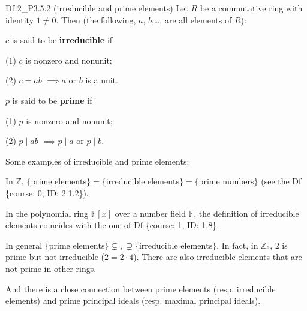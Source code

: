 \documentclass{article}
\begin{document}
\begin{Df}{Df 2\_P3.5.2 (irreducible and prime elements)}
    Let $R$ be a commutative ring with identity $1\neq 0$. Then (the following, $a$, $b$,\dots, are all elements of $R$):
    \begin{compactitem}
        \item $c$ is said to be \textbf{irreducible} if
        \begin{compactenum}
            \item[(1)] $c$ is nonzero and nonunit;
            \item[(2)] $c=ab$ \quad $\implies$\quad $a$ or $b$ is a unit.
        \end{compactenum}
        \item $p$ is said to be \textbf{prime} if
        \begin{compactenum}
            \item[(1)] $p$ is nonzero and nonunit;
            \item[(2)] $p\mid ab$ \quad $\implies$\quad $p\mid a$ or $p\mid b$.
        \end{compactenum}
    \end{compactitem}
\end{Df}

\begin{Rmk}{}
    Some examples of irreducible and prime elements:
    \begin{compactenum}
        \item \textcolor{Th}{In $\mathbb{Z}$, $\{\text{prime elements}\} = \{\text{irreducible elements}\} = \{\text{prime numbers}\}$ (see the Df \{course: 0, ID: 2.1.2\}).}
        \item \textcolor{Th}{In the polynomial ring $\mathbb{F}[x]$ over a number field $\mathbb{F}$, the definition of irreducible elements coincides with the one of Df \{course: 1, ID: 1.8\}.}
        \item \textcolor{Th}{In general $\{\text{prime elements}\} \subsetneq, \supsetneq \{\text{irreducible elements}\}$.} In fact, in $\mathbb{Z}_6$, $\bar{2}$ is prime but not irreducible ($\bar{2}=\bar{2}\cdot\bar{4}$). There are also irreducible elements that are not prime in other rings.
    \end{compactenum}
    And there is a close connection between prime elements (resp. irreducible elements) and prime principal ideals (resp. maximal principal ideals).
\end{Rmk}
\end{document}
